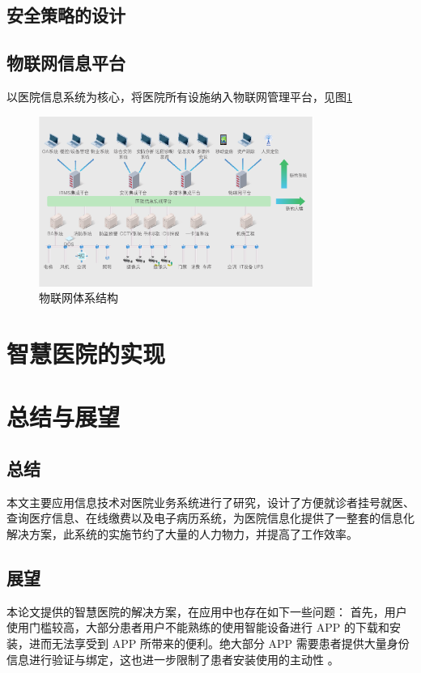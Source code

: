 \documentclass[doctor,secret]{thuthesis}
\begin{document}
\section{安全策略的设计}
\label{sec:org7230e4e}

\section{物联网信息平台}
\label{sec:org6d0c8b4}

以医院信息系统为核心，将医院所有设施纳入物联网管理平台，见图\ref{fig:internetofthings}

\begin{figure}[htbp]
\centering
\includegraphics[width=0.8\textwidth]{figures/internetofthings.pdf}
\caption{物联网体系结构 \label{fig:internetofthings}}
\end{figure}

\chapter{智慧医院的实现}
\label{sec:orgdc3fb34}
\chapter{总结与展望}
\label{sec:orgb312cb6}
\section{总结}
\label{sec:orge2b645c}
本文主要应用信息技术对医院业务系统进行了研究，设计了方便就诊者挂号就医、查询医疗信息、在线缴费以及电子病历系统，为医院信息化提供了一整套的信息化解决方案，此系统的实施节约了大量的人力物力，并提高了工作效率。
\section{展望}
\label{sec:org71c8d84}
本论文提供的智慧医院的解决方案，在应用中也存在如下一些问题：
首先，用户使用门槛较高，大部分患者用户不能熟练的使用智能设备进行 APP 的下载和安装，进而无法享受到 APP 所带来的便利。绝大部分 APP 需要患者提供大量身份信息进行验证与绑定，这也进一步限制了患者安装使用的主动性 \cite{__2013}。
\end{document}
